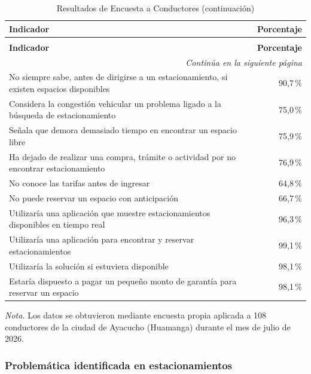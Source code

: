 \begin{longtable}{p{11cm} r}
\caption{Resultados de Encuesta a Conductores} \\
\toprule
\textbf{Indicador} & \textbf{Porcentaje} \\
\midrule
\endfirsthead

\caption[]{Resultados de Encuesta a Conductores (continuación)} \\
\toprule
\textbf{Indicador} & \textbf{Porcentaje} \\
\midrule
\endhead

\midrule
\multicolumn{2}{r}{\footnotesize\textit{Continúa en la siguiente página}} \\
\endfoot

\bottomrule
\endlastfoot

No siempre sabe, antes de dirigirse a un estacionamiento, si existen espacios disponibles & 90,7\,\% \\
Considera la congestión vehicular un problema ligado a la búsqueda de estacionamiento & 75,0\,\% \\
Señala que demora demasiado tiempo en encontrar un espacio libre & 75,9\,\% \\
Ha dejado de realizar una compra, trámite o actividad por no encontrar estacionamiento & 76,9\,\% \\
No conoce las tarifas antes de ingresar & 64,8\,\% \\
No puede reservar un espacio con anticipación & 66,7\,\% \\
Utilizaría una aplicación que muestre estacionamientos disponibles en tiempo real & 96,3\,\% \\
Utilizaría una aplicación para encontrar y reservar estacionamientos & 99,1\,\% \\
Utilizaría la solución si estuviera disponible & 98,1\,\% \\
Estaría dispuesto a pagar un pequeño monto de garantía para reservar un espacio & 98,1\,\% \\
\end{longtable}

\textit{Nota.} Los datos se obtuvieron mediante encuesta propia aplicada a 108 conductores de la ciudad de Ayacucho (Huamanga) durante el mes de julio de 2026.

\subsubsection{Problemática identificada en estacionamientos}

